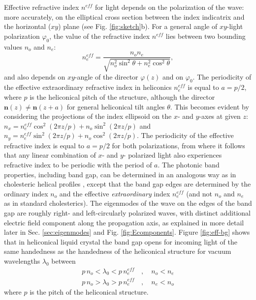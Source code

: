 \documentclass{osa-article}
\renewcommand{\vec}[1]{\mathbf{#1}}
\begin{document}
Effective refractive index $n^{eff}$ for light depends on the polarization of the wave: 
more accurately, on the elliptical cross section between the index indicatrix and the horizontal ($xy$) plane (see Fig. \ref{fig:sketch}b). 
For a general angle of $xy$-light polarization $\varphi_0$, the value of the refractive index $n^{eff}$ lies between two bounding values $n_o$ and $n_e$: 
\begin{equation}
n_e^{eff} = \dfrac{n_o n_e}{\sqrt{n_o^2 \sin^2 \theta + n_e^2 \cos^2 \theta}},
\label{eq:n-e-eff}
\end{equation}
and also depends on $xy$-angle of the director $\varphi(z)$ and on $\varphi_0$. 
The periodicity of the effective extraordinary refractive index in heliconics $n_e^{eff}$ is equal to $a=p/2$,
where $p$ is the heliconical pitch of the structure,
although the director $\vec{n}(z) \neq \vec{n}(z+a) $ for general heliconical tilt angles $\theta$. 
This becomes evident by considering the projections of the index ellipsoid on the $x$- and $y$-axes at given $z$: 
$n_x = n_e^{eff} \cos^2 (2 \pi z/p) + n_o \sin^2 (2 \pi z/p) $ and $n_y = n_e^{eff} \sin^2 (2 \pi z/p ) + n_o \cos^2 ( 2 \pi z/p )$.
The periodicity of the effective refractive index is equal to $a=p/2$ for both polarizations, 
from where it follows that any linear combination of $x$- and $y$- polarized light also experiences refractive index to be periodic with the period of $a$.
The photonic band properties, including band gap, can be determined in an analogous way as in cholesteric helical profiles \cite{ChandrasekharS_1992,KutterS_EurPhysJE12_2003},
except that the band gap edges are determined by the ordinary index $n_o$ and the effective \emph{extraordinary} index $n_e^{eff}$ 
(and not $n_o$ and $n_e$ as in standard cholesterics).
The eigenmodes of the wave on the edges of the band gap are roughly right- and left-circularly polarized waves, 
with distinct additional electric field component along the propagation axis,
as explained in more detail later in Sec. \ref{sec:eigenmodes} and Fig. \ref{fig:Ecomponents}. 
Figure \ref{fig:eff-bg} shows that in heliconical liquid crystal the band gap opens for incoming light of the same handedness as the handedness of the heliconical structure
for vacuum wavelengths $\lambda_0$ between 
\begin{align}
p \, n_o < \lambda_0 < p \, n_e^{eff} \, &, \quad n_o < n_e \\
p \, n_o > \lambda_0 > p \, n_e^{eff} \, &, \quad n_e < n_o 
\label{eq:bg}
\end{align}
where $p$ is the pitch of the heliconical structure. 
\end{document}
